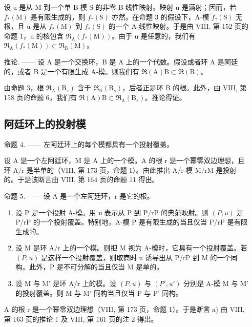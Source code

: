 设 u 是从 M 到一个单 B-模 S 的非零 B-线性映射。映射 u 是满射；因而，若 \(f_{*}(\mathrm{M})\) 是有限生成的，则 \(f_{*}(\mathrm{S})\) 亦然。在命题 3 的假设下，A-模 \(f_{*}(\mathrm{S})\) 无根，且 u 是从 \(f_{*}(\mathrm{M})\) 到 \(f_{*}(\mathrm{S})\) 的一个 A-线性映射。于是由 VIII, 第 152 页的命题 1，u 的核包含 \(\mathfrak{R}_{\mathrm{A}}(f_{*}(\mathrm{M}))\)。由于 u 是任意的，我们有 \(\mathfrak{R}_{\mathrm{A}}(f_{*}(\mathrm{M})) \subset \mathfrak{R}_{\mathrm{B}}(\mathrm{M})\)。

推论. —— 设 A 是一个交换环，B 是 A 上的一个代数。假设或者环 A 是阿廷的，或者 B 是一个有限生成 A-模。则我们有 \(\Re(\mathrm{A})\mathrm{B}\subset\Re(\mathrm{B})\)。

由命题 3，根 \(\mathfrak{R}_{\mathrm{A}}(\mathrm{B}_{s})\) 含于 \(\mathfrak{R}_{\mathrm{B}}(\mathrm{B}_{s})\)，后者正是环 B 的根。此外，由 VIII, 第 158 页的命题 6，我们有 \(\mathfrak{R}(\mathrm{A})\mathrm{B}\subset\mathfrak{R}_{\mathrm{A}}(\mathrm{B}_{s})\)。推论得证。

\subsection{阿廷环上的投射模}

命题 4. —— 左阿廷环上的每个模都具有一个投射覆盖。

设 A 是一个左阿廷环，M 是 A 上的一个模。A 的根 r 是一个幂零双边理想，且环 A/r 是半单的（VIII, 第 173 页，命题 1）。由此推出 A/r-模 M/rM 是投射的。于是该断言由 VIII, 第 164 页的命题 11 得出。

命题 5. —— 设 A 是一个左阿廷环，r 是它的根。

\begin{enumerate}
\def\labelenumi{\alph{enumi})}
\item
  设 P 是一个投射 A-模。用 u 表示从 P 到 P/rP 的典范映射。则 \((P,u)\) 是 P/rP 的一个投射覆盖。特别地，A-模 P 是有限生成的当且仅当 P/rP 是有限生成的。
\item
  设 M 是环 A/r 上的一个模。则把 M 视为 A-模时，它具有一个投射覆盖。若 \((P,u)\) 是这样一个投射覆盖，则取商时 u 诱导出从 P/rP 到 M 的一个同构。此外，P 是不可分解的当且仅当 M 是单的。
\item
  设 M 与 M' 是环 A/r 上的模。设 \((P, u)\) 与 \((P', u')\) 分别是 A-模 M 与 M' 的投射覆盖。则 M 与 M' 同构当且仅当 P 与 P' 同构。
\end{enumerate}

A 的根 r 是一个幂零双边理想（VIII, 第 173 页，命题 1）。于是断言 a) 由 VIII, 第 163 页的推论 1 及 VIII, 第 161 页的注 2 得出。

